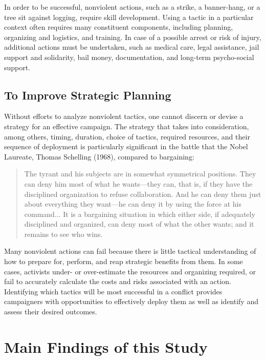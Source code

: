 \documentclass[twoside,a4paper,12pt,fleqn,openany]{extbook}
\begin{document}
In order to be successful, nonviolent actions, such as a strike, a banner-hang, or a tree
sit against logging, require skill development. Using a tactic in a particular context often
requires many constituent components, including planning, organizing and logistics, and
training. In case of a possible arrest or risk of injury, additional actions must be undertaken, such as medical care, legal assistance, jail support and solidarity, bail money, documentation, and long-term psycho-social support.

\subsection*{To Improve Strategic Planning}

Without efforts to analyze nonviolent tactics, one cannot discern or devise a strategy for an effective campaign. The strategy that takes into consideration, among others, timing, duration, choice of tactics, required resources, and their sequence of deployment is particularly significant in the battle that the Nobel Laureate, Thomas Schelling (1968), compared to bargaining:

\begin{quote}
The tyrant and his subjects are in somewhat symmetrical positions. They can deny him most of what he wants—they can, that is, if they have the disciplined organization to refuse collaboration. And he can deny them just about everything they want—he can deny it by using the force at his command... It is a bargaining situation in which either side, if adequately disciplined and organized, can deny most of what the other wants; and it remains to see who wins.
\end{quote}

Many nonviolent actions can fail because there is little tactical understanding of how to prepare for, perform, and reap strategic benefits from them. In some cases, activists under- or over-estimate the resources and organizing required, or fail to accurately calculate the costs and risks associated with an action. Identifying which tactics will be most successful in a conflict provides campaigners with opportunities to effectively deploy them as well as identify and assess their desired outcomes.

\section*{Main Findings of this Study}
\end{document}
